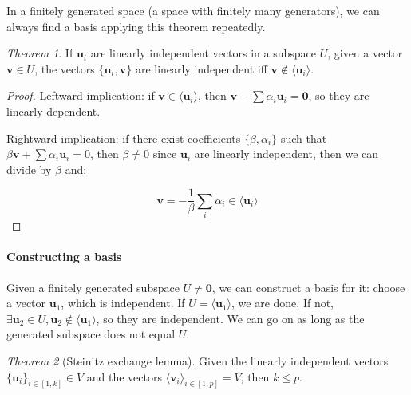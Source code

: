\documentclass[12pt,a4paper]{report}
\numberwithin{equation}{section}
\theoremstyle{definition}
\theoremstyle{remark}
\newtheorem{theorem}{Theorem}[section]
\begin{document}
In a finitely generated space (a space with finitely many generators), we can always find a basis applying this theorem repeatedly.

\begin{theorem}
If $\mathbf{u}_i$ are linearly independent vectors in a subspace $U$, given a vector $\mathbf{v} \in U$, the vectors $\lbrace \mathbf{u}_i, \mathbf{v}\rbrace$ are linearly independent iff $\mathbf{v} \notin \langle \mathbf{u}_i \rangle$.
\end{theorem}

\begin{proof}
Leftward implication: if $\mathbf{v} \in \langle \mathbf{u}_i \rangle$, then $\mathbf{v}- \sum \alpha_i \mathbf{u}_i = \mathbf{0}$, so they are linearly dependent.

Rightward implication: if there exist coefficients $\lbrace \beta, \alpha_i \rbrace$ such that $\beta \mathbf{v} + \sum \alpha_i \mathbf{u}_i = 0$, then $\beta \neq 0$ since $\mathbf{u}_i$ are linearly independent, then we can divide by $\beta$ and:

\begin{equation}
\mathbf{v} = -\frac 1\beta \sum_i \alpha_i \in \langle \mathbf{u}_i\rangle
\end{equation}
\end{proof}

\paragraph{Constructing a basis}

Given a finitely generated subspace $U\neq \mathbf{0}$, we can construct a basis for it: choose a vector $\mathbf{u}_1$, which is independent. If $U = \langle \mathbf{u}_1\rangle$, we are done. If not, $\exists \mathbf{u}_2 \in U, \mathbf{u}_2 \notin \langle \mathbf{u}_1\rangle$, so they are independent. We can go on as long as the generated subspace does not equal $U$.

\begin{theorem}[Steinitz exchange lemma]
Given the linearly independent vectors $\lbrace \mathbf{u}_i\rbrace_{i \in [1, k]} \in V$ and the vectors $\langle \mathbf{v}_i\rangle_{i \in [1, p]} = V$, then $k \leq p$.
\end{theorem}
\end{document}
